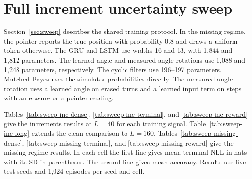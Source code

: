 \FloatBarrier
\section{Full increment uncertainty sweep}
\label{app:sweep}

Section~\ref{sec:sweep} describes the shared training protocol. In the missing
regime, the pointer reports the true position with probability $0.8$ and
draws a uniform token otherwise. The GRU and LSTM use widths 16 and 13, with
1{,}844 and 1{,}812 parameters. The learned-angle and measured-angle rotations
use 1{,}088 and 1{,}248 parameters, respectively. The cyclic filters use
196--197 parameters. Matched Bayes uses the simulator probabilities directly.
The measured-angle rotation uses a learned angle on erased turns and a learned
input term on steps with an erasure or a pointer reading.

Tables~\ref{tab:sweep-inc-dense}, \ref{tab:sweep-inc-terminal}, and
\ref{tab:sweep-inc-reward} give the increments results at $L=40$ for each
training signal. Table~\ref{tab:sweep-inc-long} extends the clean comparison
to $L=160$. Tables~\ref{tab:sweep-missing-dense},
\ref{tab:sweep-missing-terminal}, and \ref{tab:sweep-missing-reward} give the
missing-regime results. In each cell the first line gives mean terminal NLL in
nats with its SD in parentheses. The second line gives mean accuracy. Results
use five test seeds and 1{,}024 episodes per seed and cell.

\newcommand{\sweepcell}[3]{\shortstack{#1 (#2)\\#3}}

